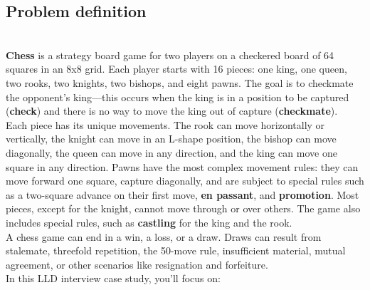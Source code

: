 

\subsection{Problem definition}\label{GdBbXiDwBbAsUwxqCLfX8}
\\
\textbf{Chess} is a strategy board game for two players on a checkered board of 64 squares in an 8x8 grid. Each player starts with 16 pieces: one king, one queen, two rooks, two knights, two bishops, and eight pawns. The goal is to checkmate the opponent's king---this occurs when the king is in a position to be captured (\textbf{check}) and there is no way to move the king out of capture (\textbf{checkmate}).
\\
Each piece has its unique movements. The rook can move horizontally or vertically, the knight can move in an L-shape position, the bishop can move diagonally, the queen can move in any direction, and the king can move one square in any direction. Pawns have the most complex movement rules: they can move forward one square, capture diagonally, and are subject to special rules such as a two-square advance on their first move, \textbf{en passant}, and \textbf{promotion}. Most pieces, except for the knight, cannot move through or over others. The game also includes special rules, such as \textbf{castling} for the king and the rook.
\\
A chess game can end in a win, a loss, or a draw. Draws can result from stalemate, threefold repetition, the 50-move rule, insufficient material, mutual agreement, or other scenarios like resignation and forfeiture.
\\
In this LLD interview case study, you'll focus on:

